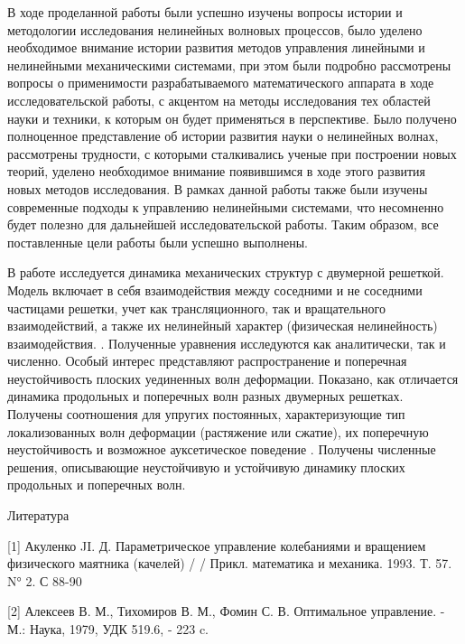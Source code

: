 В ходе проделанной работы были успешно изучены вопросы истории и методологии исследования нелинейных волновых процессов, было уделено необходимое внимание истории развития методов управления линейными и нелинейными механическими системами, при этом были подробно рассмотрены вопросы о применимости разрабатываемого математического аппарата в ходе исследовательской работы, с акцентом на методы исследования тех областей науки и техники, к которым он будет применяться в перспективе.
Было получено полноценное представление об истории развития науки о нелинейных волнах, рассмотрены трудности, с которыми сталкивались ученые при построении новых теорий, уделено необходимое внимание появившимся в ходе этого развития новых методов исследования. В рамках данной работы также были изучены современные подходы к управлению нелинейными системами, что несомненно будет полезно для дальнейшей исследовательской работы. Таким образом, все поставленные цели работы были успешно выполнены.



В работе исследуется динамика механических структур с двумерной решеткой. Модель включает в себя взаимодействия между соседними и не соседними частицами решетки, учет как трансляционного, так и вращательного взаимодействий, а также их нелинейный характер (физическая нелинейность) взаимодействия. . Полученные уравнения исследуются как аналитически, так и численно. Особый интерес представляют распространение и поперечная неустойчивость плоских уединенных волн деформации. Показано, как отличается динамика продольных и поперечных волн разных двумерных решетках. Получены соотношения для упругих постоянных, характеризующие тип локализованных волн деформации (растяжение или сжатие), их поперечную неустойчивость и возможное ауксетическое поведение . Получены численные решения, описывающие неустойчивую и устойчивую динамику плоских продольных и поперечных волн.

Литература

[1] Акуленко JI. Д. Параметрическое управление колебаниями и вращением физического маятника (качелей) / / Прикл. математика и механика. 1993. Т. 57. N° 2. С 88-90

[2] Алексеев В. М., Тихомиров В. М., Фомин С. В. Оптимальное управление. - М.: Наука, 1979, УДК 519.6, - 223 c.


